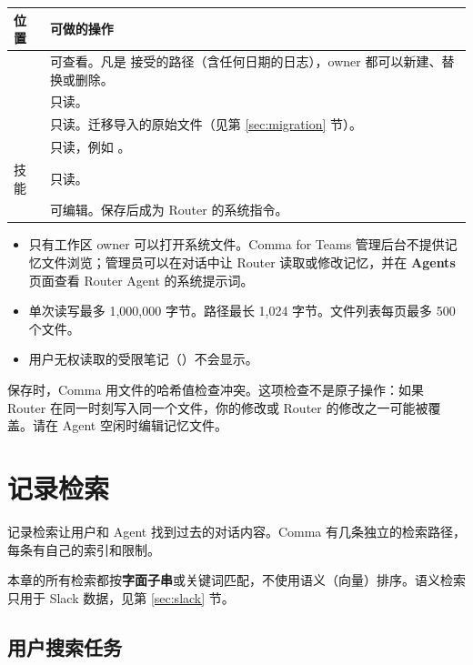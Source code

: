\documentclass[UTF8,a4paper,11pt]{ctexart}
\begin{document}
\begin{longtable}{P{4.2cm}P{9.6cm}}
\toprule
位置 & 可做的操作 \\
\midrule
\endhead
{} & 可查看。凡是  接受的路径（含任何日期的日志），owner 都可以新建、替换或删除。 \\
 & 只读。 \\
 & 只读。迁移导入的原始文件（见第 \ref{sec:migration} 节）。 \\
 & 只读，例如 。 \\
技能 & 只读。 \\
 & 可编辑。保存后成为 Router 的系统指令。 \\
\bottomrule
\end{longtable}

\begin{itemize}
  \item 只有工作区 owner 可以打开系统文件。Comma for Teams 管理后台不提供记忆文件浏览；管理员可以在对话中让 Router 读取或修改记忆，并在 \textbf{Agents} 页面查看 Router Agent 的系统提示词。
  \item 单次读写最多 1,000,000 字节。路径最长 1,024 字节。文件列表每页最多 500 个文件。
  \item 用户无权读取的受限笔记（）不会显示。
\end{itemize}

\begin{warn}[并发编辑]
保存时，Comma 用文件的哈希值检查冲突。这项检查不是原子操作：如果 Router 在同一时刻写入同一个文件，你的修改或 Router 的修改之一可能被覆盖。请在 Agent 空闲时编辑记忆文件。
\end{warn}

\section{记录检索}

记录检索让用户和 Agent 找到过去的对话内容。Comma 有几条独立的检索路径，每条有自己的索引和限制。

\begin{note}[匹配方式]
本章的所有检索都按\textbf{字面子串}或关键词匹配，不使用语义（向量）排序。语义检索只用于 Slack 数据，见第 \ref{sec:slack} 节。
\end{note}

\subsection{用户搜索任务}
\end{document}
